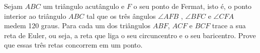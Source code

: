 Sejam $ABC$ um triângulo acutângulo e $F$ o seu ponto de Fermat, isto é, o ponto interior ao triângulo $ABC$ tal que os três ângulos $\angle AFB$ , $\angle BFC$ e $\angle CFA$ medem 120 graus.
Para cada um dos triângulos $ABF$, $ACF$ e $BCF$ trace a sua reta de Euler, ou seja, a reta que liga o seu circuncentro e o seu baricentro.
Prove que essas três retas concorrem em um ponto.